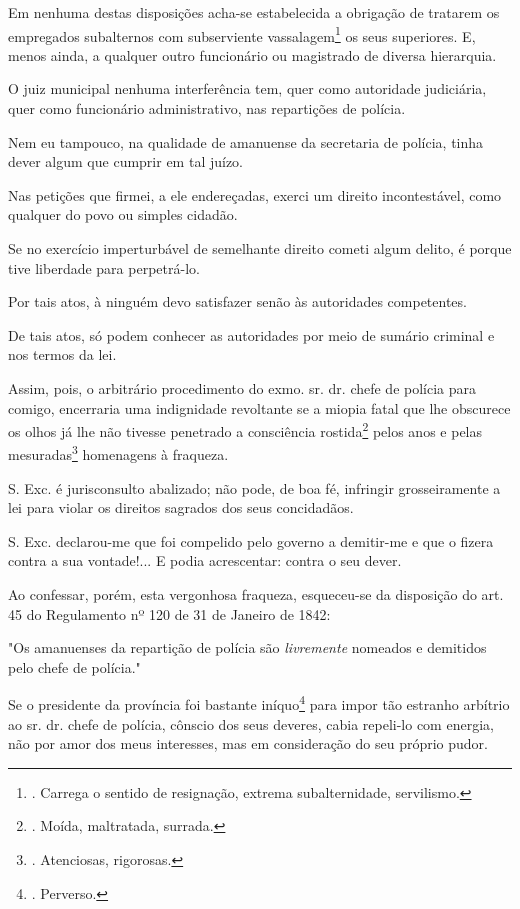 Em nenhuma destas disposições acha-se estabelecida a obrigação de
tratarem os empregados subalternos com subserviente
vassalagem\footnote{. Carrega o sentido de resignação, extrema
  subalternidade, servilismo.} os seus superiores. E, menos ainda, a
qualquer outro funcionário ou magistrado de diversa hierarquia.

O juiz municipal nenhuma interferência tem, quer como autoridade
judiciária, quer como funcionário administrativo, nas repartições de
polícia.

Nem eu tampouco, na qualidade de amanuense da secretaria de polícia,
tinha dever algum que cumprir em tal juízo.

Nas petições que firmei, a ele endereçadas, exerci um direito
incontestável, como qualquer do povo ou simples cidadão.

Se no exercício imperturbável de semelhante direito cometi algum delito,
é porque tive liberdade para perpetrá-lo.

Por tais atos, à ninguém devo satisfazer senão às autoridades
competentes.

De tais atos, só podem conhecer as autoridades por meio de sumário
criminal e nos termos da lei.

Assim, pois, o arbitrário procedimento do exmo. sr. dr. chefe de polícia
para comigo, encerraria uma indignidade revoltante se a miopia fatal que
lhe obscurece os olhos já lhe não tivesse penetrado a consciência
rostida\footnote{. Moída, maltratada, surrada.} pelos anos e pelas
mesuradas\footnote{. Atenciosas, rigorosas.} homenagens à fraqueza.

S. Exc. é jurisconsulto abalizado; não pode, de boa fé, infringir
grosseiramente a lei para violar os direitos sagrados dos seus
concidadãos.

S. Exc. declarou-me que foi compelido pelo governo a demitir-me e que o
fizera contra a sua vontade!... E podia acrescentar: contra o seu dever.

Ao confessar, porém, esta vergonhosa fraqueza, esqueceu-se da disposição
do art. 45 do Regulamento nº 120 de 31 de Janeiro de 1842:

"Os amanuenses da repartição de polícia são \emph{livremente} nomeados e
demitidos pelo chefe de polícia."

Se o presidente da província foi bastante iníquo\footnote{. Perverso.}
para impor tão estranho arbítrio ao sr. dr. chefe de polícia, cônscio
dos seus deveres, cabia repeli-lo com energia, não por amor dos meus
interesses, mas em consideração do seu próprio pudor.

